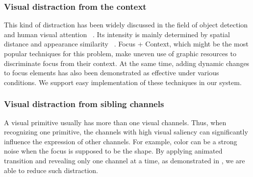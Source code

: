 \subsubsection{Visual distraction from the context}
This kind of distraction has been widely discussed in the field of object detection and human visual attention ~\cite{nothdurft_salience_2000, standage_modelling_2005}. Its intensity is mainly  determined by spatial distance and appearance similarity ~\cite{wolfe_guided_1994}. 
Focus + Context, which might be the most popular techniques for this problem, make uneven use of graphic resources to discriminate focus from their context. At the same time, adding dynamic changes to focus elements has also been demonstrated as effective under various conditions\cite{waldner_attractive_2014}. We support easy implementation of these techniques in our system. 

\subsubsection{Visual distraction from sibling channels}
A visual primitive usually has more than one visual channels. Thus, when recognizing one primitive, the channels with high visual saliency can significantly influence the expression of other channels. For example, color can be a strong noise when the focus is supposed to be the shape. By applying animated transition and revealing only one channel at a time, as demonstrated in , we are able to reduce such distraction.


